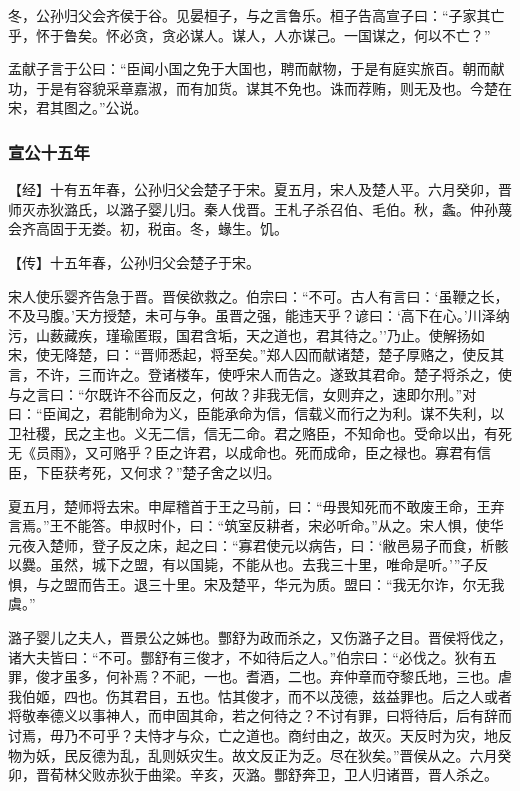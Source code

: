 \documentclass[]{article}
\begin{document}
冬，公孙归父会齐侯于谷。见晏桓子，与之言鲁乐。桓子告高宣子曰：``子家其亡乎，怀于鲁矣。怀必贪，贪必谋人。谋人，人亦谋己。一国谋之，何以不亡？''

孟献子言于公曰：``臣闻小国之免于大国也，聘而献物，于是有庭实旅百。朝而献功，于是有容貌采章嘉淑，而有加货。谋其不免也。诛而荐贿，则无及也。今楚在宋，君其图之。''公说。

\hypertarget{header-n1466}{%
\subsubsection{宣公十五年}\label{header-n1466}}

【经】十有五年春，公孙归父会楚子于宋。夏五月，宋人及楚人平。六月癸卯，晋师灭赤狄潞氏，以潞子婴儿归。秦人伐晋。王札子杀召伯、毛伯。秋，螽。仲孙蔑会齐高固于无娄。初，税亩。冬，蝝生。饥。

【传】十五年春，公孙归父会楚子于宋。

宋人使乐婴齐告急于晋。晋侯欲救之。伯宗曰：``不可。古人有言曰：`虽鞭之长，不及马腹。'天方授楚，未可与争。虽晋之强，能违天乎？谚曰：`高下在心。'川泽纳污，山薮藏疾，瑾瑜匿瑕，国君含垢，天之道也，君其待之。''乃止。使解扬如宋，使无降楚，曰：``晋师悉起，将至矣。''郑人囚而献诸楚，楚子厚赂之，使反其言，不许，三而许之。登诸楼车，使呼宋人而告之。遂致其君命。楚子将杀之，使与之言曰：``尔既许不谷而反之，何故？非我无信，女则弃之，速即尔刑。''对曰：``臣闻之，君能制命为义，臣能承命为信，信载义而行之为利。谋不失利，以卫社稷，民之主也。义无二信，信无二命。君之赂臣，不知命也。受命以出，有死无《员雨》，又可赂乎？臣之许君，以成命也。死而成命，臣之禄也。寡君有信臣，下臣获考死，又何求？''楚子舍之以归。

夏五月，楚师将去宋。申犀稽首于王之马前，曰：``毋畏知死而不敢废王命，王弃言焉。''王不能答。申叔时仆，曰：``筑室反耕者，宋必听命。''从之。宋人惧，使华元夜入楚师，登子反之床，起之曰：``寡君使元以病告，曰：`敝邑易子而食，析骸以爨。虽然，城下之盟，有以国毙，不能从也。去我三十里，唯命是听。'''子反惧，与之盟而告王。退三十里。宋及楚平，华元为质。盟曰：``我无尔诈，尔无我虞。''

潞子婴儿之夫人，晋景公之姊也。酆舒为政而杀之，又伤潞子之目。晋侯将伐之，诸大夫皆曰：``不可。酆舒有三俊才，不如待后之人。''伯宗曰：``必伐之。狄有五罪，俊才虽多，何补焉？不祀，一也。耆酒，二也。弃仲章而夺黎氏地，三也。虐我伯姬，四也。伤其君目，五也。怙其俊才，而不以茂德，兹益罪也。后之人或者将敬奉德义以事神人，而申固其命，若之何待之？不讨有罪，曰将待后，后有辞而讨焉，毋乃不可乎？夫恃才与众，亡之道也。商纣由之，故灭。天反时为灾，地反物为妖，民反德为乱，乱则妖灾生。故文反正为乏。尽在狄矣。''晋侯从之。六月癸卯，晋荀林父败赤狄于曲梁。辛亥，灭潞。酆舒奔卫，卫人归诸晋，晋人杀之。
\end{document}
